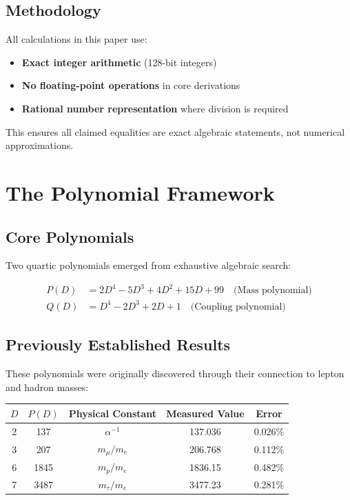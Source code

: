 \documentclass[11pt,a4paper]{article}
\begin{document}
\subsection{Methodology}

All calculations in this paper use:
\begin{itemize}
    \item \textbf{Exact integer arithmetic} (128-bit integers)
    \item \textbf{No floating-point operations} in core derivations
    \item \textbf{Rational number representation} where division is required
\end{itemize}

This ensures all claimed equalities are exact algebraic statements, not numerical approximations.

\section{The Polynomial Framework}

\subsection{Core Polynomials}

Two quartic polynomials emerged from exhaustive algebraic search:

\begin{align}
P(D) &= 2D^4 - 5D^3 + 4D^2 + 15D + 99 \quad \text{(Mass polynomial)} \\
Q(D) &= D^4 - 2D^3 + 2D + 1 \quad \text{(Coupling polynomial)}
\end{align}

\subsection{Previously Established Results}

These polynomials were originally discovered through their connection to lepton and hadron masses:

\begin{center}
\begin{tabular}{ccccc}
\hline
$D$ & $P(D)$ & Physical Constant & Measured Value & Error \\
\hline
2 & 137 & $\alpha^{-1}$ & 137.036 & 0.026\% \\
3 & 207 & $m_\mu/m_e$ & 206.768 & 0.112\% \\
6 & 1845 & $m_p/m_e$ & 1836.15 & 0.482\% \\
7 & 3487 & $m_\tau/m_e$ & 3477.23 & 0.281\% \\
\hline
\end{tabular}
\end{center}
\end{document}
